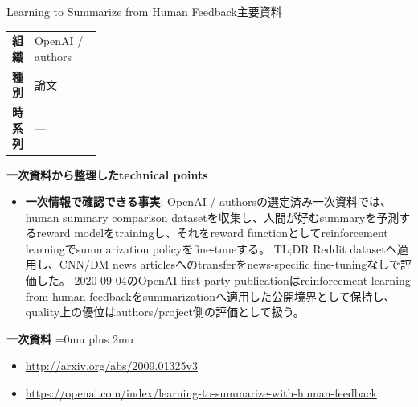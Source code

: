 \begin{technicalnote}{Learning to Summarize from Human Feedback}{主要資料}
\begingroup
\begin{tabularx}{\linewidth}{@{}>{\bfseries}p{0.22\linewidth}X@{}}
組織 & OpenAI / authors \\
種別 & 論文 \\
時系列 & — \\
\end{tabularx}
\smallskip
{\bfseries 一次資料から整理したtechnical points}
\begin{itemize}[leftmargin=1.5em,itemsep=0.35em]
\item \textbf{一次情報で確認できる事実}: OpenAI / authorsの選定済み一次資料では、human summary comparison datasetを収集し、人間が好むsummaryを予測するreward modelをtrainingし、それをreward functionとしてreinforcement learningでsummarization policyをfine-tuneする。 TL;DR Reddit datasetへ適用し、CNN/DM news articlesへのtransferをnews-specific fine-tuningなしで評価した。 2020-09-04のOpenAI first-party publicationはreinforcement learning from human feedbackをsummarizationへ適用した公開境界として保持し、quality上の優位はauthors/project側の評価として扱う。
\end{itemize}
\begin{minipage}{\linewidth}
\begin{samepage}
{\bfseries 一次資料}
\begingroup\sloppy
\Urlmuskip=0mu plus 2mu\relax
\begin{itemize}[leftmargin=1.5em,itemsep=0.25em]
\item {\scriptsize\url{http://arxiv.org/abs/2009.01325v3}}
\item {\scriptsize\url{https://openai.com/index/learning-to-summarize-with-human-feedback}}
\end{itemize}
\endgroup
\end{samepage}
\end{minipage}
\endgroup
\end{technicalnote}
\medskip
